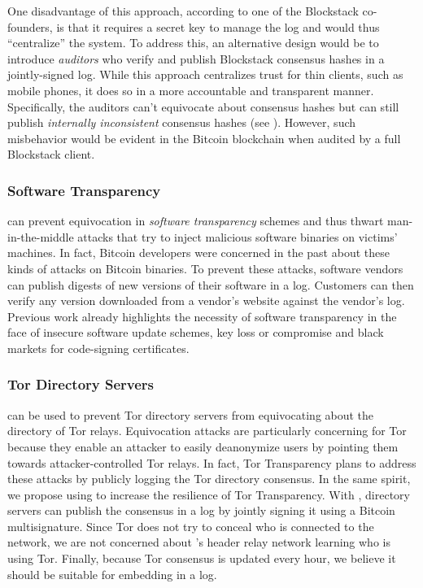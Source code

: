 One disadvantage of this approach, according to one of the Blockstack co-founders\cite{blockstack-shea-jun-2016}, is that it requires a secret key to manage the \Sys log and would thus ``centralize'' the system.
To address this, an alternative design would be to introduce \emph{auditors} who verify and publish Blockstack consensus hashes in a jointly-signed \Sys log.
While this approach centralizes trust for thin clients, such as mobile phones, it does so in a more accountable and transparent manner.
Specifically, the auditors can't equivocate about consensus hashes but can still publish \emph{internally inconsistent}\cite{ht} consensus hashes (see ).
However, such misbehavior would be evident in the Bitcoin blockchain when audited by a full Blockstack client.

\subsubsection{Software Transparency}
\Sys can prevent equivocation in \emph{software transparency} schemes\cite{software-transparency} and thus thwart man-in-the-middle attacks that try to inject malicious software binaries on victims' machines\cite{software-transparency}.
In fact, Bitcoin developers were concerned in the past about these kinds of attacks on Bitcoin binaries\cite{bitcoin-binary-transparency}.
To prevent these attacks, software vendors can publish digests of new versions of their software in a \Sys log.
Customers can then verify any version downloaded from a vendor's website against the vendor's log.
Previous work\cite{cosi} already highlights the necessity of software transparency in the face of insecure software update schemes\cite{secure-software-updates,attacks-on-package-managers}, key loss or compromise \cite{microsoft-golden-key} and black markets for code-signing certificates\cite{blackmarket-certs}.

\subsubsection{Tor Directory Servers}
\Sys can be used to prevent Tor directory servers\cite{tor} from equivocating about the directory of Tor relays.
Equivocation attacks are particularly concerning for Tor because they enable an attacker to easily deanonymize users by pointing them towards attacker-controlled Tor relays.
In fact, Tor Transparency\cite{tortransparency} plans to address these attacks by publicly logging the Tor directory consensus.
In the same spirit, we propose using \Sys to increase the resilience of Tor Transparency.
With \Sys, directory servers can publish the consensus in a \Sys log by jointly signing it using a Bitcoin multisignature\cite{multisig}.
Since Tor does not try to conceal who is connected to the network\cite{tor}, we are not concerned about \Sys's header relay network learning who is using Tor.
Finally, because Tor consensus is updated every hour, we believe it should be suitable for embedding in a \Sys log.


